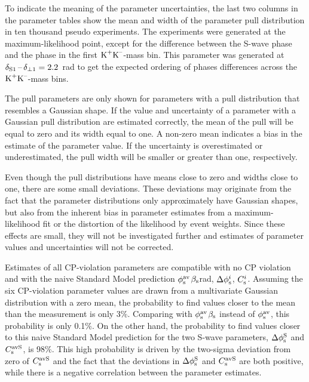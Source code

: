 To indicate the meaning of the parameter uncertainties, the last two columns in the parameter tables show the mean and width of the
parameter pull distribution in ten thousand pseudo experiments. The experiments were generated at the maximum-likelihood point, except for
the difference between the S-wave phase and the \BstoJpsiphi{} phase in the first $\KK$-mass bin. This parameter was generated at
$\delSperp[\text{1}]=2.2$~rad to get the expected ordering of phases differences across the $\KK$-mass bins.

The pull parameters are only shown for parameters with a pull distribution that resembles a Gaussian shape. If the value and uncertainty of
a parameter with a Gaussian pull distribution are estimated correctly, the mean of the pull will be equal to zero and its width equal to
one. A non-zero mean indicates a bias in the estimate of the parameter value. If the uncertainty is overestimated or underestimated, the
pull width will be smaller or greater than one, respectively.

Even though the pull distributions have means close to zero and widths close to one, there are some small deviations. These deviations may
originate from the fact that the parameter distributions only approximately have Gaussian shapes, but also from the inherent bias in
parameter estimates from a maximum-likelihood fit or the distortion of the likelihood by event weights. Since these effects are small, they
will not be investigated further and estimates of parameter values and uncertainties will not be corrected.

Estimates of all CP-violation parameters are compatible with no CP violation and with the naive Standard Model prediction
$\phisav$\texteq{}$\bs$\mbox{\textapprox{}\unitsp{}rad}, $\Delphisi$, $\Csi$. Assuming the six \BstoJpsiphi{}
CP-violation parameter values are drawn from a multivariate Gaussian distribution with a zero mean, the probability to find values closer
to the mean than the measurement is only 3\%. Comparing with $\phisav$\texteq{}$\bs$ instead of $\phisav$, this probability is
only 0.1\%. On the other hand, the probability to find values closer to this naive Standard Model prediction for the two S-wave parameters,
$\DelphisS$ and $\CsavS$, is 98\%. This high probability is driven by the two-sigma deviation from zero of $\CsavS$ and the fact that the
deviations in $\DelphisS$ and $\CsavS$ are both positive, while there is a negative correlation between the parameter estimates.

